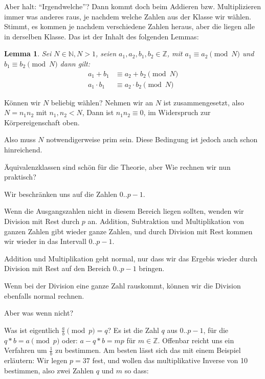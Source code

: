 \documentclass{article}
\newcommand{\N}{\mathbb{N}}
\newcommand{\Z}{\mathbb{Z}}
\newcounter{thm}
\newtheorem{lemma}[thm]{Lemma}
\begin{document}
Aber halt: ``Irgendwelche''? Dann kommt doch beim Addieren bzw. Multiplizieren
immer was anderes raus, je nachdem welche Zahlen aus der Klasse wir
wählen. Stimmt, es kommen je nachdem verschiedene Zahlen heraus, aber die
liegen alle in derselben Klasse. Das ist der Inhalt des folgenden Lemmas:

\begin{lemma}
    Sei $N \in \N, N > 1$, seien $a_1, a_2, b_1, b_2 \in \Z$,
    mit $a_1 \equiv a_2 \pmod N$ und $b_1 \equiv b_2 \pmod N$  dann gilt:
    \begin{equation}
      \begin{split}
        \label{op:mod}
        a_1 + b_1 & \equiv  a_2 + b_2 \pmod N \\
        a_1 \cdot b_1 & \equiv  a_2 \cdot b_2 \pmod N
      \end{split}
    \end{equation}
\end{lemma}

Können wir $N$ beliebig wählen? Nehmen wir an $N$ ist zusammengesetzt, also
$N = n_1 n_2$ mit $n_1, n_2 < N$, Dann ist $n_1 n_2 \equiv 0$, im Widerspruch zur
Körpereigenschaft oben.

Also muss $N$ notwendigerweise prim sein. Diese Bedingung ist jedoch auch
schon hinreichend.

Äquivalenzklassen sind schön für die Theorie, aber Wie rechnen wir nun
praktisch?

Wir beschränken uns auf die Zahlen $0..p-1$.

Wenn die Ausgangszahlen nicht in diesem Bereich liegen sollten, wenden wir
Division mit Rest durch $p$ an. Addition, Subtraktion und Multiplikation von
ganzen Zahlen gibt wieder ganze Zahlen, und durch Division mit Rest kommen wir
wieder in das Intervall $0..p-1$.

Addition und Multiplikation geht normal, nur dass wir das
Ergebis wieder durch Division mit Rest auf den Bereich $0..p-1$ bringen.

Wenn bei der Division eine ganze Zahl rauskommt, können wir die Division
ebenfalls normal rechnen.

Aber was wenn nicht?

Was ist eigentlich $\frac a b \pmod p = q$? Es ist die Zahl $q$ aus $0..p-1$, für
die $q*b = a \pmod p$ oder:  $a - q*b = m p$ für $m \in \Z$. Offenbar reicht
uns ein Verfahren um $\frac 1 b$ zu bestimmen. Am besten lässt sich das mit
einem Beispiel erläutern: Wir legen $p=37$ fest, und wollen das multiplikative
Inverse von 10 bestimmen, also zwei Zahlen $q$ und $m$ so dass:
\end{document}
